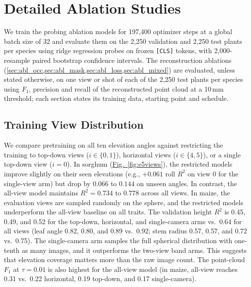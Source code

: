 \documentclass[10pt,twocolumn,letterpaper]{article}
\newcommand{\figref}[1]{\hyperref[#1]{Fig.~\ref*{#1}}}
\begin{document}
\section{Detailed Ablation Studies}
\label{app:ablations}

We train the probing ablation models for 197{,}400 optimizer steps at a global batch size of 32 and evaluate them on
the 2{,}250 validation and 2{,}250 test plants per species using ridge regression probes on frozen \texttt{[CLS]}
tokens, with 2{,}000-resample paired bootstrap confidence intervals. The reconstruction ablations
(\cref{sec:abl_occ,sec:abl_mask,sec:abl_loss,sec:abl_mixed}) are evaluated, unless stated otherwise, on
one view or shot of each of the 2{,}250 test plants per species using $F_1$, precision and recall of the reconstructed point cloud at a 10\,mm
threshold; each section states its training data, starting point and schedule.
\subsection{Training View Distribution}
\label{app:views-full}

We compare pretraining on all ten elevation angles against restricting the training to top-down views ($i \in \{0,1\}$), horizontal views ($i \in \{4,5\}$), or a single top-down view ($i = 0$). In sorghum (\figref{fig:e5views}), the restricted models improve slightly on their seen elevations (e.g., $+0.061$ roll $R^2$ on view 0 for the single-view arm) but drop by $0.066$ to $0.144$ on unseen angles. In contrast, the all-view model maintains $R^2 = 0.734$ to $0.778$ across all views. In maize, the evaluation views are sampled randomly on the sphere, and the restricted models underperform the all-view baseline on all traits. The validation height $R^2$ is 0.45, 0.49, and 0.52 for the top-down, horizontal, and single-camera arms vs.\ 0.64 for all views (leaf angle 0.82, 0.80, and 0.89 vs.\ 0.92; stem radius 0.57, 0.57, and 0.72 vs.\ 0.75). The single-camera arm samples the full spherical distribution with one-tenth as many images, and it outperforms the two-view band arms. This suggests that elevation coverage matters more than the raw image count. The point-cloud $F_1$ at $\tau = 0.01$ is also highest for the all-view model (in maize, all-view reaches 0.31 vs.\ 0.22 horizontal, 0.19 top-down, and 0.17 single-camera).
\end{document}
